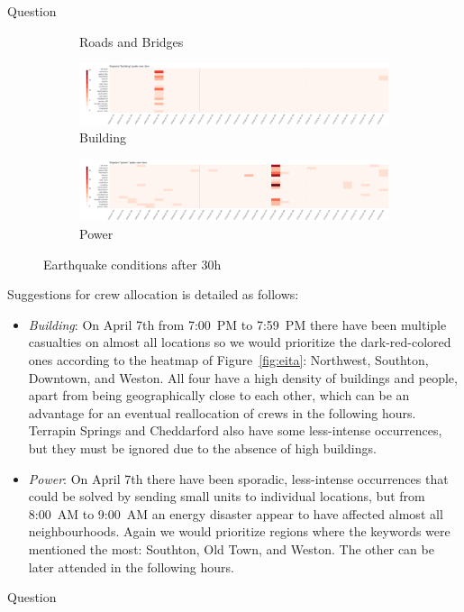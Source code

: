 \documentclass{article}
\begin{document}
\begin{section}{Question}
\begin{figure}[!h]
\begin{subfigure}[!h]{0.48\textwidth}
        \caption{Roads and Bridges}
    \end{subfigure}
    \begin{subfigure}[!h]{0.48\textwidth}
        \centering
        \includegraphics[width=1.00\textwidth]{figs/cond_30h/cond_30h_build.png}
        \caption{Building}
    \end{subfigure}
    \begin{subfigure}[!h]{0.48\textwidth}
        \centering
        \includegraphics[width=1.00\textwidth]{figs/cond_30h/cond_30h_power.png}
        \caption{Power}
    \end{subfigure}
    \caption{Earthquake conditions after 30h}
    \label{fig:eq_cond_30h}
\end{figure}

Suggestions for crew allocation is detailed as follows:

\begin{itemize}
    \item \emph{Building}: On April 7th from 7:00~PM to 7:59~PM there have been
    multiple casualties on almost all locations so we would prioritize the
    dark-red-colored ones according to the heatmap of Figure~\ref{fig:eita}:
    Northwest, Southton, Downtown, and Weston. All four have a high 
    density of buildings and people, apart from being geographically close to
    each other, which can be an advantage for an eventual reallocation of crews
    in the following hours. Terrapin Springs and Cheddarford also have some
    less-intense occurrences, but they must be ignored due to the absence of
    high buildings.
    \item \emph{Power}: On April 7th there have been sporadic, less-intense
    occurrences that could be solved by sending small units to individual
    locations, but from 8:00~AM to 9:00~AM an energy disaster appear to have
    affected almost all neighbourhoods. Again we would prioritize regions where
    the keywords were mentioned the most: Southton, Old Town, and Weston. The
    other can be later attended in the following hours.
\end{itemize}
\end{section}

\begin{section}{Question}
\end{section}
\end{document}
